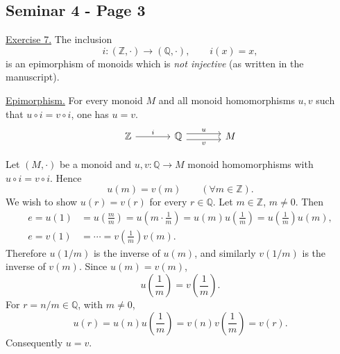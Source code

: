 
\subsection*{Seminar 4 - Page 3}

\noindent\underline{Exercise 7.}
The inclusion
\[
 i:(\mathbb Z,\cdot)\longrightarrow(\mathbb Q,\cdot),
 \qquad i(x)=x,
\]
is an epimorphism of monoids which is \emph{not injective}
(as written in the manuscript).

\smallskip
\noindent\underline{Epimorphism.}
For every monoid $M$ and all monoid homomorphisms $u,v$ such that
$u\circ i=v\circ i$, one has $u=v$.
\[
\begin{tikzcd}[column sep=large]
 \mathbb Z \arrow[r,"i"] &
 \mathbb Q \arrow[r,shift left=.7ex,"u"]
            \arrow[r,shift right=.7ex,swap,"v"] & M
\end{tikzcd}
\]

\noindent Let $(M,\cdot)$ be a monoid and
$u,v:\mathbb Q\to M$ monoid homomorphisms with
$u\circ i=v\circ i$. Hence
\[
 u(m)=v(m)\qquad(\forall m\in\mathbb Z).
\]
We wish to show $u(r)=v(r)$ for every $r\in\mathbb Q$.
Let $m\in\mathbb Z$, $m\ne0$. Then
\[
\begin{aligned}
 e=u(1)
  &=u\!\left(\frac{m}{m}\right)
   =u\!\left(m\cdot\frac1m\right)
   =u(m)u\!\left(\frac1m\right)
   =u\!\left(\frac1m\right)u(m),\\
 e=v(1)
  &=\cdots
   =v\!\left(\frac1m\right)v(m).
\end{aligned}
\]
Therefore $u(1/m)$ is the inverse of $u(m)$, and similarly
$v(1/m)$ is the inverse of $v(m)$. Since $u(m)=v(m)$,
\[
 u\!\left(\frac1m\right)=v\!\left(\frac1m\right).
\]
For $r=n/m\in\mathbb Q$, with $m\ne0$,
\[
 u(r)=u(n)u\!\left(\frac1m\right)
     =v(n)v\!\left(\frac1m\right)=v(r).
\]
Consequently $u=v$.

